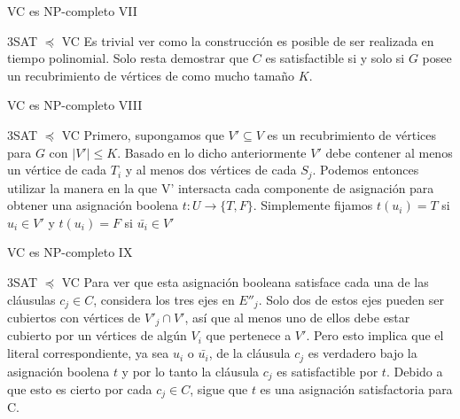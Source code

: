 \documentclass[10pt, mathserif, profesionalfont]{beamer}
\begin{document}
\begin{frame}{VC es NP-completo VII}

\begin{block}{3SAT $\preceq$ VC}    
Es trivial ver como la construcción es posible de ser realizada en tiempo polinomial. Solo resta demostrar que $C$ es satisfactible si y solo si $G$ posee un recubrimiento de vértices de como mucho tamaño $K$.
\end{block}

\end{frame}


\begin{frame}{VC es NP-completo VIII}

\begin{block}{3SAT $\preceq$ VC}    
Primero, supongamos que $V' \subseteq V$ es un recubrimiento de vértices para $G$ con $|V'| \le K$. Basado en lo dicho anteriormente $V'$ debe contener al menos un vértice de cada $T_i$ y al menos dos vértices de cada $S_j$. Podemos entonces utilizar la manera en la que V' intersacta cada componente de asignación para obtener una asignación boolena $t: U \rightarrow \{T,F\}$. Simplemente fijamos $t(u_i)=T$ si $u_i \in V'$ y $t(u_i) = F$ si $\bar{u_i}\in V'$
\end{block}

\end{frame}


\begin{frame}{VC es NP-completo IX}

\begin{block}{3SAT $\preceq$ VC}    
Para ver que esta asignación booleana satisface cada una de las cláusulas $c_j \in C$, considera los tres ejes en $E''_j$. Solo dos de estos ejes pueden ser cubiertos con vértices de $V'_j \cap V'$, así que al menos uno de ellos debe estar cubierto por un vértices de algún $V_i$ que pertenece a $V'$. Pero esto implica que el literal correspondiente, ya sea $u_i$ o $\bar{u_i}$, de la cláusula $c_j$ es verdadero bajo la asignación boolena $t$ y por lo tanto la cláusula $c_j$ es satisfactible por $t$. Debido a que esto es cierto por cada $c_j \in C$, sigue que $t$ es una asignación satisfactoria para C.
\end{block}

\end{frame}
\end{document}
